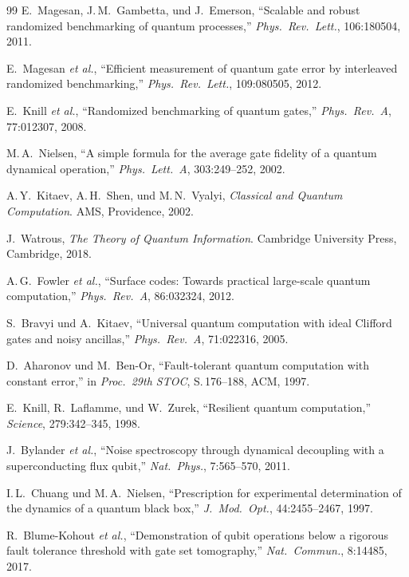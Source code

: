 ﻿\documentclass[11pt,a4paper]{article}
\theoremstyle{definition}
\begin{document}
\begin{thebibliography}{99}
E.\ Magesan, J.\,M.\ Gambetta, und J.\ Emerson,
``Scalable and robust randomized benchmarking of quantum processes,''
\textit{Phys.\ Rev.\ Lett.}, 106:180504, 2011.

E.\ Magesan \textit{et al.},
``Efficient measurement of quantum gate error by interleaved randomized benchmarking,''
\textit{Phys.\ Rev.\ Lett.}, 109:080505, 2012.

E.\ Knill \textit{et al.},
``Randomized benchmarking of quantum gates,''
\textit{Phys.\ Rev.\ A}, 77:012307, 2008.

M.\,A.\ Nielsen,
``A simple formula for the average gate fidelity of a quantum dynamical operation,''
\textit{Phys.\ Lett.\ A}, 303:249--252, 2002.

A.\,Y.\ Kitaev, A.\,H.\ Shen, und M.\,N.\ Vyalyi,
\textit{Classical and Quantum Computation}.
AMS, Providence, 2002.

J.\ Watrous,
\textit{The Theory of Quantum Information}.
Cambridge University Press, Cambridge, 2018.

A.\,G.\ Fowler \textit{et al.},
``Surface codes: Towards practical large-scale quantum computation,''
\textit{Phys.\ Rev.\ A}, 86:032324, 2012.

S.\ Bravyi und A.\ Kitaev,
``Universal quantum computation with ideal Clifford gates and noisy ancillas,''
\textit{Phys.\ Rev.\ A}, 71:022316, 2005.

D.\ Aharonov und M.\ Ben-Or,
``Fault-tolerant quantum computation with constant error,''
in \textit{Proc.\ 29th STOC}, S.\,176--188, ACM, 1997.

E.\ Knill, R.\ Laflamme, und W.\ Zurek,
``Resilient quantum computation,''
\textit{Science}, 279:342--345, 1998.

J.\ Bylander \textit{et al.},
``Noise spectroscopy through dynamical decoupling with a superconducting flux qubit,''
\textit{Nat.\ Phys.}, 7:565--570, 2011.

I.\,L.\ Chuang und M.\,A.\ Nielsen,
``Prescription for experimental determination of the dynamics of a quantum black box,''
\textit{J.\ Mod.\ Opt.}, 44:2455--2467, 1997.

R.\ Blume-Kohout \textit{et al.},
``Demonstration of qubit operations below a rigorous fault tolerance threshold with gate set tomography,''
\textit{Nat.\ Commun.}, 8:14485, 2017.


\end{thebibliography}
\end{document}
